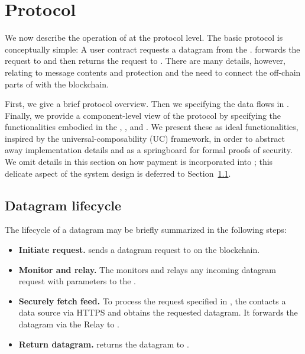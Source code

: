 

\section{\tc Protocol}

We now describe the operation of \tc at the protocol level. The basic protocol is conceptually simple: A user contract \reqcont requests a datagram from the \tcontract \tcont. \tcont forwards the request to \engine and then returns the request to \reqcont. There are many details, however, relating to message contents and protection and the need to connect the off-chain parts of \tc with the blockchain.

First, we give a brief protocol overview. Then we specifying the data flows in \tc. Finally, we provide a component-level view of the protocol by specifying the functionalities embodied in the \tcontract, \medname, and \encname. We present these  as ideal functionalities, inspired by the universal-composability (UC) framework, in order to abstract away implementation details and as a springboard for formal proofs of security. We omit details in this section on how payment is incorporated into \tc; this delicate aspect of the system design is deferred to Section~\ref{}.

\subsection{Datagram lifecycle}

The lifecycle of a datagram may be briefly summarized in the following steps:

\begin{itemize}
\item {\bf Initiate request.} \reqcont sends a datagram request to \tcont on the blockchain.

\item {\bf Monitor and relay.} The \medname monitors \tcont and relays any incoming datagram request with parameters \dgform to the \encname.

\item {\bf Securely fetch feed.} To process the request specified in \dgform, the \encname contacts a data source via HTTPS and obtains the requested datagram. It forwards the datagram via the Relay to \tcont.

\item {\bf Return datagram.} \tcont returns the datagram to \reqcont.
\end{itemize}

